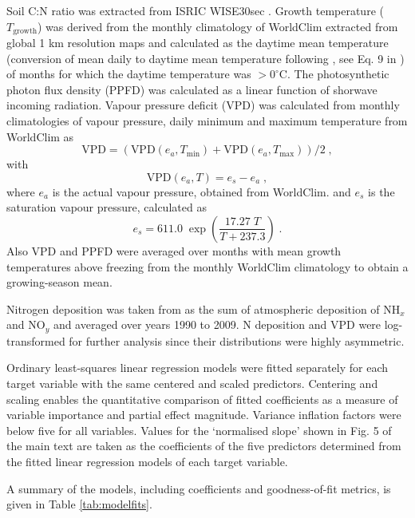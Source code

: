 \documentclass{myreport}
\begin{document}
Soil C:N ratio was extracted from ISRIC WISE30sec \citep{batjes_harmonized_2016}. Growth temperature ($T_\text{growth}$) was derived from the monthly climatology of WorldClim extracted from global 1 km resolution maps \citep{fick_worldclim_2017} and calculated as the daytime mean temperature (conversion of mean daily to daytime mean temperature following \citet{jones_plants_2013}, see Eq. 9 in \citet{dong22jecol}) of months for which the daytime temperature was $>0^\circ$C. The photosynthetic photon flux density (PPFD) was calculated as a linear function of shorwave incoming radiation. Vapour pressure deficit (VPD) was calculated from monthly climatologies of vapour pressure, daily minimum and maximum temperature from WorldClim as
\begin{equation}
\text{VPD} = \left(\text{VPD}(e_a, T_\text{min}) + \text{VPD}(e_a, T_\text{max})\right)/2\;,
\end{equation}
with 
\begin{equation}
\text{VPD}(e_a, T) = e_s - e_a \;,
\end{equation}
where $e_a$ is the actual vapour pressure, obtained from WorldClim. and $e_s$ is the saturation vapour pressure, calculated as
\begin{equation}
e_s = 611.0 \; \exp \left( \frac{17.27 \; T}{T + 237.3} \right) \;.
\end{equation}
Also VPD and PPFD were averaged over months with mean growth temperatures above freezing from the monthly WorldClim climatology to obtain a growing-season mean.

Nitrogen deposition was taken from \citet{lamarque_global_2011} as the sum of atmospheric deposition of NH$_x$ and NO$_y$ and averaged over years 1990 to 2009. N deposition and VPD were log-transformed for further analysis since their distributions were highly asymmetric.

Ordinary least-squares linear regression models were fitted separately for each target variable with the same centered and scaled predictors. Centering and scaling enables the quantitative comparison of fitted coefficients as a measure of variable importance and partial effect magnitude. Variance inflation factors were below five for all variables. Values for the `normalised slope' shown in Fig. 5 of the main text are taken as the coefficients of the five predictors determined from the fitted linear regression models of each target variable.

A summary of the models, including coefficients and goodness-of-fit metrics, is given in Table \ref{tab:modelfits}.
\end{document}
